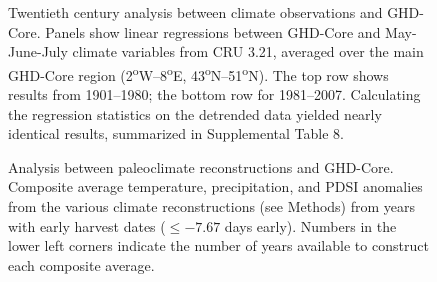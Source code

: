 \documentclass[final]{nature}
\begin{document}
\begin{figure}
\caption{Twentieth century analysis between climate observations and GHD-Core. Panels show linear regressions between GHD-Core and May-June-July climate variables from CRU 3.21, averaged over the main GHD-Core region (2\textsuperscript{o}W--8\textsuperscript{o}E, 43\textsuperscript{o}N--51\textsuperscript{o}N). The top row shows results from 1901--1980; the bottom row for 1981--2007. Calculating the regression statistics on the detrended data yielded nearly identical results, summarized in Supplemental Table 8.}
\end{figure}

\begin{figure}
\caption{Analysis between paleoclimate reconstructions and GHD-Core. Composite average temperature, precipitation, and PDSI anomalies from the various climate reconstructions (see Methods) from years with early harvest dates ($\le-7.67$ days early). Numbers in the lower left corners indicate the number of years available to construct each composite average.}
\end{figure}

\end{document}
